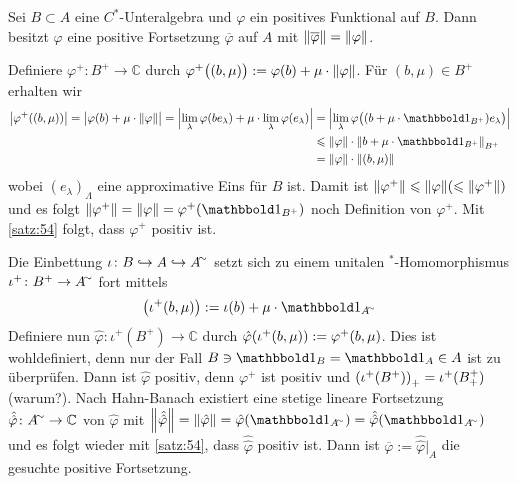 \begin{satz}[label=satz:57,{name=[positive Fortsetzung positiver Funktionale]}]
	Sei $B \subset A$ eine $C^*$-Unteralgebra und $\varphi$ ein positives Funktional auf $B$. 
	Dann besitzt $\varphi$ eine positive Fortsetzung $\overline{\varphi}$ auf $A$ mit $\norm*{\overline{\varphi}} = \norm*{\varphi}$.
\end{satz}
\begin{beweis}
	Definiere $\varphi^+ \colon B^+ \to \mathbb{C}$ durch $\varphi^+ \enbrace[\big]{(b,\mu)} := \varphi(b) + \mu \cdot \norm*{\varphi}$.
	Für $(b,\mu) \in B^+$ erhalten wir 
	\begin{align}
		\abs*{\varphi^+ \enbrace*{(b,\mu)}} = \abs[\big]{\varphi(b) + \mu \cdot \norm*{\varphi}} = \abs[\Big]{\lim_\lambda \varphi \enbrace*{b e_\lambda} + \mu \cdot \lim_\lambda \varphi(e_\lambda) } &= \abs[\Big]{\lim_\lambda \varphi \enbrace[\big]{(b+ \mu \cdot \ind_{B^+})e_\lambda}} \\
		&\le \norm*{\varphi} \cdot  \norm*{b+ \mu \cdot \ind_{B^+}}_{B^+} \\
		&= \norm*{\varphi} \cdot \norm*{(b,\mu)}
	\end{align}
	wobei $(e_\lambda)_\Lambda$ eine approximative Eins für $B$ ist. 
	Damit ist $\norm*{\varphi^+} \le \norm*{\varphi} \enbrace*{\le \norm*{\varphi^+}}$ und es folgt $\norm*{\varphi^+}=\norm*{\varphi}=\varphi^+(\ind_{B^+})$ noch Definition von $\varphi^+$.
	Mit \autoref{satz:54} folgt, dass $\varphi^+$ positiv ist.
	
	Die Einbettung $\iota \colon B \hookrightarrow A \hookrightarrow A^\simm$ setzt sich zu einem unitalen $^*$-Homomorphismus $\iota^+ \colon B^+ \to A^\simm$ fort mittels
	\[
		\enbrace*{\iota^+ \enbrace*{b,\mu}} := \iota(b) + \mu \cdot \ind_{A^\simm}
	\]
	Definiere nun $\hat{\varphi} \colon \iota^+(B^+) \to \mathbb{C}$ durch $\hat{\varphi} \enbrace*{\iota^+(b,\mu)} := \varphi^+(b,\mu)$. 
	Dies ist wohldefiniert, denn nur der Fall $B\ni \ind_B= \ind_A \in A$ ist zu überprüfen.
	Dann ist $\hat{\varphi}$ positiv, denn $\varphi^+$ ist positiv und $\enbrace*{\iota^+(B^+)}_+ = \iota^+(B^+_+) $ (warum?).
	Nach Hahn-Banach existiert eine stetige lineare Fortsetzung $\hat{\hat{\varphi}} \colon A^\simm  \to \mathbb{C}$ von $\hat{\varphi}$ mit $\norm*{\hat{\hat{\varphi}}}=\norm*{\hat{\varphi}}=\hat{\varphi}(\ind_{A^\simm})= \hat{\hat{\varphi}}(\ind_{A^\simm})$ und es folgt wieder mit \autoref{satz:54}, dass $\hat{\hat{\varphi}}$ positiv ist.
	Dann ist $\overline{\varphi} := \hat{\hat{\varphi}}|_A$ die gesuchte positive Fortsetzung. 
\end{beweis}

